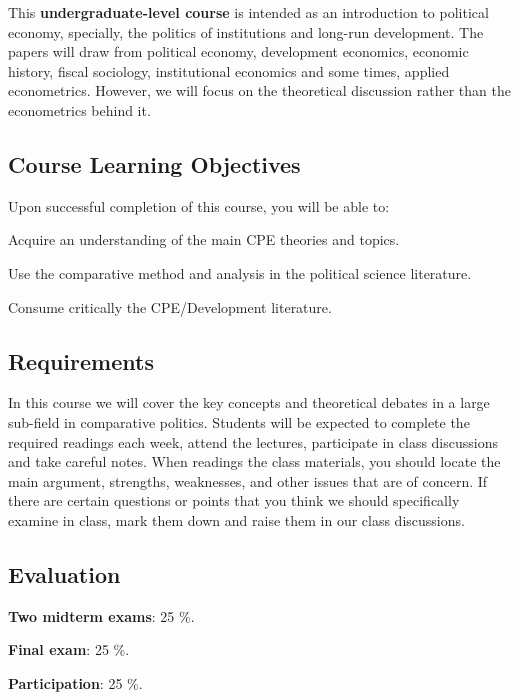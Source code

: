 \documentclass[letterpaper]{article}
\renewenvironment{itemize}{
  \begin{list}{}{
    \setlength{\leftmargin}{1.5em}
  }
}{
  \end{list}
}
\begin{document}
This {\bf {\color{blue}undergraduate-level course}} is intended as an introduction to political economy, specially, the politics of institutions and long-run development. The papers will draw from political economy, development economics, economic history, fiscal sociology, institutional economics and some times, applied econometrics. However, we will focus on the theoretical discussion rather than the econometrics behind it.



\subsection*{Course Learning Objectives}
 
Upon successful completion of this course, you will be able to:

\begin{itemize}
	\item[$\bullet$] Acquire an understanding of the main CPE theories and topics.
	\item[$\bullet$] Use the comparative method and analysis in the political science literature.
	\item[$\bullet$] Consume critically the CPE/Development literature.
\end{itemize}



\subsection*{Requirements}

In this course we will cover the key concepts and theoretical debates in a large sub-field in comparative politics. Students will be expected to complete the required readings each week, attend the lectures, participate in class discussions and take careful notes. When readings the class materials, you should locate the main argument, strengths, weaknesses, and other issues that are of concern. If there are certain questions or points that you think we should specifically examine in class, mark them down and raise them in our class discussions.

\subsection*{Evaluation}


\begin{itemize}
	\item[$\bullet$] {\bf Two midterm exams}: 25 \%.
	\item[$\bullet$] {\bf Final exam}: 25 \%.
	\item[$\bullet$] {\bf Participation}: 25 \%.
\end{itemize}
\end{document}
